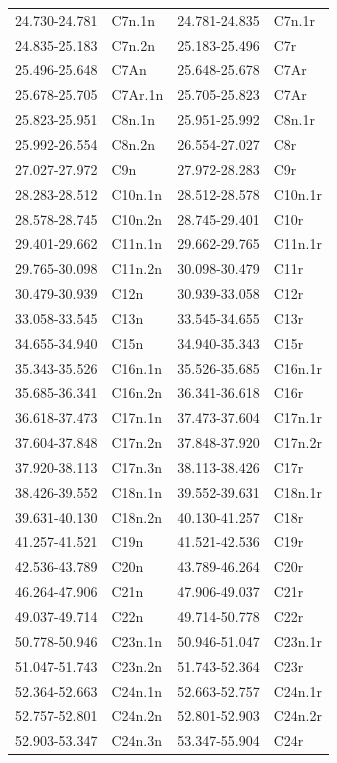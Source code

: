 \begin{center}
\begin{longtable}{ll|ll}
24.730-24.781 & C7n.1n & 24.781-24.835 & C7n.1r\\
24.835-25.183 & C7n.2n & 25.183-25.496 & C7r\\
25.496-25.648 & C7An & 25.648-25.678 & C7Ar\\
25.678-25.705 & C7Ar.1n & 25.705-25.823 & C7Ar\\
25.823-25.951 & C8n.1n & 25.951-25.992 & C8n.1r\\
25.992-26.554 & C8n.2n & 26.554-27.027 & C8r\\
27.027-27.972 & C9n & 27.972-28.283 & C9r\\
28.283-28.512 & C10n.1n & 28.512-28.578 & C10n.1r\\
28.578-28.745 &  C10n.2n & 28.745-29.401 &  C10r\\
29.401-29.662 &  C11n.1n & 29.662-29.765 & C11n.1r\\
29.765-30.098 & C11n.2n & 30.098-30.479 & C11r\\
30.479-30.939 & C12n & 30.939-33.058 & C12r\\
33.058-33.545 & C13n & 33.545-34.655 & C13r\\
34.655-34.940 & C15n & 34.940-35.343 & C15r\\
35.343-35.526 & C16n.1n & 35.526-35.685 & C16n.1r\\
35.685-36.341 & C16n.2n & 36.341-36.618 & C16r\\
36.618-37.473 & C17n.1n & 37.473-37.604 & C17n.1r\\
37.604-37.848 & C17n.2n & 37.848-37.920 & C17n.2r\\
37.920-38.113 & C17n.3n & 38.113-38.426 & C17r\\
38.426-39.552 & C18n.1n & 39.552-39.631 & C18n.1r\\
39.631-40.130 & C18n.2n & 40.130-41.257 & C18r\\
41.257-41.521 & C19n & 41.521-42.536 & C19r\\
42.536-43.789 & C20n & 43.789-46.264 & C20r\\
46.264-47.906 & C21n & 47.906-49.037 & C21r\\
49.037-49.714 & C22n & 49.714-50.778 & C22r\\
50.778-50.946 & C23n.1n & 50.946-51.047 & C23n.1r\\
51.047-51.743 & C23n.2n & 51.743-52.364 & C23r\\
52.364-52.663 & C24n.1n & 52.663-52.757 & C24n.1r\\
52.757-52.801 & C24n.2n & 52.801-52.903 & C24n.2r\\
52.903-53.347 & C24n.3n & 53.347-55.904 & C24r\\

\end{longtable}
\end{center}
